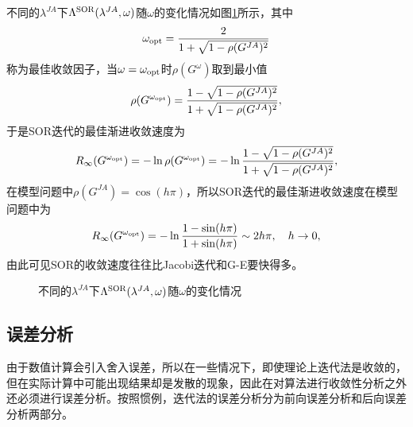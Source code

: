 \documentclass[a4paper,10pt]{ctexart}
\begin{document}
不同的$ \lambda^{JA} $下$ \Lambda^{\rm SOR}(\lambda^{JA}, \omega) $随$ \omega $的变化情况如图\ref{fig:SORfactor}所示，其中
\[
    \omega_{\rm opt} = \frac{2}{1+ \sqrt{1-\rho(G^{JA})^2} }
\]
称为最佳收敛因子，当$ \omega = \omega_{\rm opt} $时$ \rho(G^\omega) $取到最小值
\[
    \rho(G^{\omega_{\rm opt}}) = \frac{1-\sqrt{1-\rho(G^{JA})^2}}{1+\sqrt{1-\rho(G^{JA})^2} },
\]
于是SOR迭代的最佳渐进收敛速度为
\[
    R_\infty(G^{\omega_{\rm opt}}) = -\ln\rho(G^{\omega_{\rm opt}}) = -\ln \frac{1-\sqrt{1-\rho(G^{JA})^2}}{1+\sqrt{1-\rho(G^{JA})^2} },
\]
在模型问题中$ \rho(G^{JA}) = \cos(h \pi) $，所以SOR迭代的最佳渐进收敛速度在模型问题中为
\[
    R_\infty(G^{\omega_{\rm opt}}) = -\ln \frac{1-\sin(h \pi)}{1+\sin(h \pi)}\sim 2h \pi,\quad h\to 0,
\]
由此可见SOR的收敛速度往往比Jacobi迭代和G-E要快得多。
\begin{figure}[htpb]
    \centering
    \caption{不同的$ \lambda^{JA} $下$ \Lambda^{\rm SOR}(\lambda^{JA}, \omega) $随$ \omega $的变化情况}
    \label{fig:SORfactor}
\end{figure}

\subsection{误差分析}
由于数值计算会引入舍入误差，所以在一些情况下，即使理论上迭代法是收敛的，但在实际计算中可能出现结果却是发散的现象，因此在对算法进行收敛性分析之外还必须进行误差分析。按照惯例，迭代法的误差分析分为前向误差分析和后向误差分析两部分。
\end{document}
